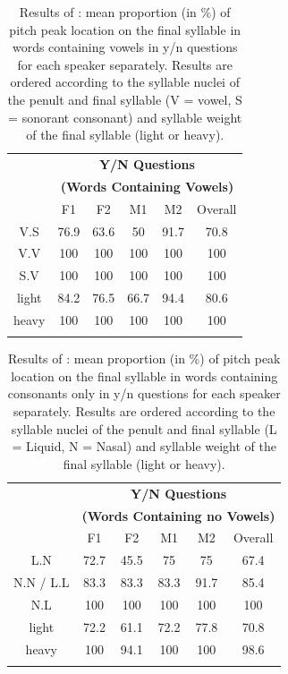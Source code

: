 \begin{table}
\centering
\caption{Results of \citet[250f.]{Grice.etal2015tash}: mean proportion (in \%) of pitch peak location on the final syllable in words containing vowels in y/n questions for each speaker separately. Results are ordered according to the syllable nuclei of the penult and final syllable (V = vowel, S = sonorant consonant) and syllable weight of the final syllable (light or heavy).}
\label{tab:5.7}
\begin{tabular}{cccccc}
\lsptoprule
      & \multicolumn{5}{c}{\textbf{Y/N Questions}} \\ 
      & \multicolumn{5}{c}{\textbf{(Words Containing Vowels)}} \\
\cmidrule {2-6}
          & F1        & F2        & M1        & M2             & Overall     \\
\midrule
V.S   & 76.9 & 63.6 & 50   & 91.7 &  70.8 \\
V.V   & 100  & 100  & 100  & 100  &   100  \\
S.V   & 100  & 100  & 100  & 100  &   100  \\
\midrule
light & 84.2 & 76.5 & 66.7 & 94.4 &   80.6 \\
heavy & 100  & 100  & 100  & 100  &   100  \\
\lspbottomrule
\end{tabular}
\end{table}

\begin{table}
\centering
\caption{Results of \citet[250f.]{Grice.etal2015tash}: mean proportion (in \%) of pitch peak location on the final syllable in words containing consonants only in y/n questions for each speaker separately. Results are ordered according to the syllable nuclei of the penult and final syllable (L = Liquid, N = Nasal) and syllable weight of the final syllable (light or heavy).}
\label{tab:5.8}
\begin{tabular}{cccccc}
\lsptoprule
      & \multicolumn{5}{c}{\textbf{Y/N Questions}} \\ 
      & \multicolumn{5}{c}{\textbf{(Words Containing no Vowels)}} \\
\cmidrule {2-6}
          & F1        & F2        & M1        & M2             & Overall     \\
\midrule
L.N       & 72.7 & 45.5 & 75   & 75   &   67.4 \\
N.N / L.L & 83.3 & 83.3 & 83.3 & 91.7 &   85.4 \\
N.L       & 100  & 100  & 100  & 100  &   100  \\
\midrule
light     & 72.2 & 61.1 & 72.2 & 77.8 &   70.8 \\
heavy     & 100  & 94.1 & 100  & 100  &   98.6 \\
\lspbottomrule
\end{tabular}
\end{table}

